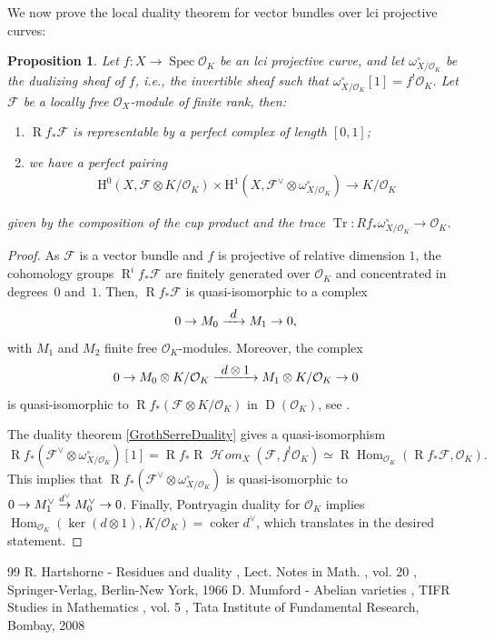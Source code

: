 \documentclass[10pt,a4paper]{amsart}
\newcommand\To[1]{\mathchoice{\xrightarrow{\textstyle\kern4pt#1\kern3pt}}{\stackrel{#1}{\to}}{}{}}
\numberwithin{equation}{section}
\newtheorem{prop}{Proposition}[section]
\theoremstyle{definition}
\newcommand{\n}[1]{\mathcal{#1}}
\newcommand{\s}[1]{\mathscr{#1}}
\DeclareMathOperator{\Tr}{Tr}
\DeclareMathOperator{\R}{R}
\DeclareMathOperator{\D}{D}
\DeclareMathOperator{\Hom}{Hom}
\DeclareMathOperator{\coker}{coker}
\DeclareMathOperator{\Spec}{Spec}
\DeclareMathOperator{\sHom}{\s{H}\!\mathit{om}}
\newcommand{\ie}{i.e.,\xspace}
\begin{document}
We now prove the local duality theorem for vector bundles over lci projective curves:

\begin{prop}
\label{LocalDualityCurves}
Let $f: X\to \Spec \n{O}_K$ be an lci projective curve, and let $\omega_{X/\n{O}_K}^\circ$ be the dualizing sheaf of $f$, \ie the invertible sheaf such that $\omega_{X/\n{O}_K}^\circ[1]=f^!\n{O}_K$. Let~$\n{F}$ be a locally free $\s{O}_X$-module of finite rank, then:
\begin{enumerate}

\item $\R f_*\n{F}$ is representable by a perfect complex of length $[0,1]$;

\item we have a perfect pairing
\begin{align*}
\mathrm{H}^0(X,\n{F}\otimes K/\n{O}_K)\times \mathrm{H}^1(X, \n{F}^\vee\otimes \omega_{X/\n{O}_K}^\circ)\to K/\n{O}_K
\end{align*}
\end{enumerate}
given by the composition of the cup product and the trace $\Tr: Rf_* \omega^{\circ}_{X/\n{O}_K}\to \n{O}_K$.
\end{prop}

\begin{proof}
As $\n{F}$ is a vector bundle and $f$ is projective of relative dimension $1$, the cohomology groups $\R^i f_* \n{F}$ are finitely generated over $\n{O}_K$ and concentrated in degrees~$0$ and~$1$. Then, $\R f_* \n{F}$ is quasi-isomorphic to a complex
\[
0 \to M_0 \To{d}M_1\to 0,
\]
with $M_1$ and $M_2$ finite free $\n{O}_K$-modules. Moreover, the complex
\[
0 \to M_0\otimes K/\n{O}_K \To{d\otimes 1} M_1\otimes K/\n{O}_K \to 0
\]
is quasi-isomorphic to $\R f_*(\n{F}\otimes K/\n{O}_K)$ in $\D(\n{O}_K)$, see \cite[Th.\,5.2]{mumford1974abelian}.

The duality theorem \ref{GrothSerreDuality} gives a quasi-isomorphism
\[
\R f_*(\n{F}^{\vee}\otimes \omega^{\circ}_{X/\n{O}_K})[1] =\R f_*\R\sHom_{X}(\n{F}, f^!\n{O}_K)\simeq \R\Hom_{\n{O}_K}(\R f_*\n{F}, \n{O}_K).
\]
This implies that $\R f_* (\n{F}^\vee \otimes \omega_{X/\n{O}_K}^\circ)$ is quasi-isomorphic to $0 \to M_1^\vee \To{d^\vee}M_0^\vee \to 0$. Finally, Pontryagin duality for $\n{O}_K$ implies $\Hom_{\n{O}_K}(\ker(d\otimes 1), K/\n{O}_K)= \coker d^\vee$, which translates in the desired statement.
\end{proof}

\begin{thebibliography}{99}
 R. Hartshorne - Residues and duality , Lect. Notes in Math. , vol. 20 , Springer-Verlag, Berlin-New York, 1966
 D. Mumford - Abelian varieties , TIFR Studies in Mathematics , vol. 5 , Tata Institute of Fundamental Research, Bombay, 2008
\end{thebibliography}
\end{document}
